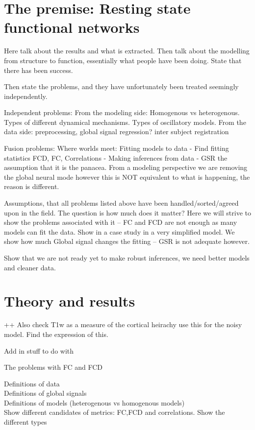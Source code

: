 \documentclass[oneside]{./zHenriquesLab-StyleBioRxiv}
\begin{document}
\section*{The premise: Resting state functional networks}

Here talk about the results and what is extracted. Then talk about the modelling from structure to function, essentially what people have been doing. State that there has been success. 

Then state the problems, and they have unfortunately been treated seemingly independently.

Independent problems:
From the modeling side: Homogenous vs heterogenous. Types of different dynamical mechanisms. Types of oscillatory models.
From the data side: preprocessing, global signal regression? inter subject registration

Fusion problems:
Where worlds meet:
Fitting models to data
- Find fitting statistics FCD, FC, Correlations
- Making inferences from data
- GSR the assumption that it is the panacea. From a modeling perspective we are removing the global neural mode however this is NOT equivalent to what is happening, the reason is different. 

Assumptions, that all problems listed above have been handled/sorted/agreed upon in the field. The question is how much does it matter? Here we will strive to show the problems associated with it -- FC and FCD are not enough as many models can fit the data. Show in a case study in a very simplified model. We show how much Global signal changes the fitting -- GSR is not adequate however. 

Show that we are not ready yet to make robust inferences, we need better models and cleaner data.

\section*{Theory and results}
++ Also check T1w as a measure of the cortical heirachy use this for the noisy model. Find the expression of this. 


Add in stuff to do with 

The problems with FC and FCD

Definitions of data \\
Definitions of global signals \\
Definitions of models (heterogenous vs homogenous models) \\
Show different candidates of metrics: FC,FCD and correlations.
Show the different types \\
\end{document}
